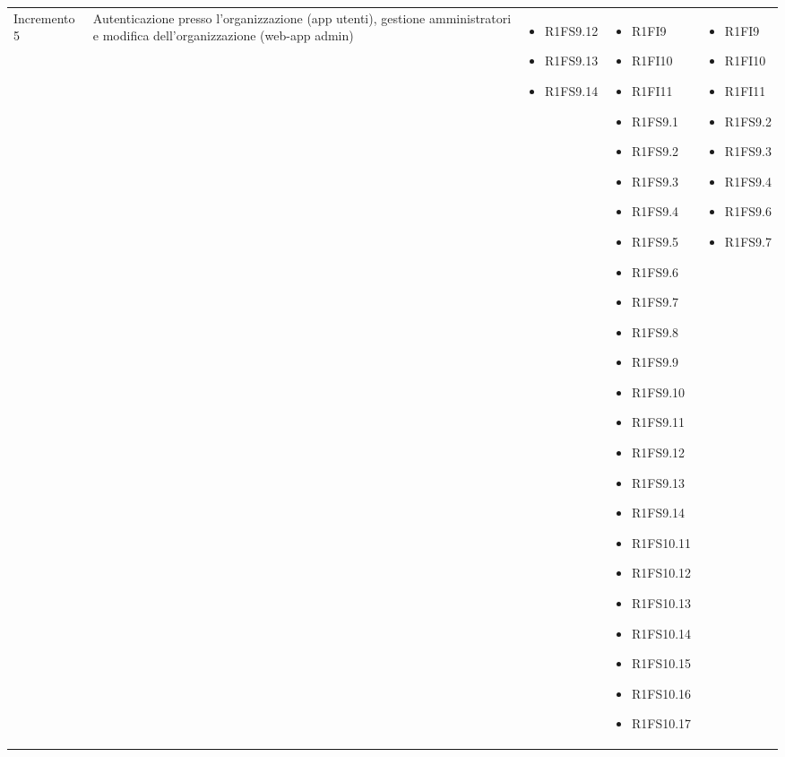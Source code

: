 {\begin{longtable}{C{2.5cm} C{3.2cm} C{2.8cm} C{2.8cm} C{2.8cm}}
Incremento 5 & Autenticazione presso l'organizzazione (app utenti), gestione amministratori  e modifica dell'organizzazione (web-app admin) & \begin{itemize}
    \item[ ] R1FS9.12
    \item[ ] R1FS9.13
    \item[ ] R1FS9.14
\end{itemize} & \begin{itemize} 
    \item[ ] R1FI9
    \item[ ] R1FI10
    \item[ ] R1FI11
    \item[ ] R1FS9.1
    \item[ ] R1FS9.2
    \item[ ] R1FS9.3
    \item[ ] R1FS9.4
    \item[ ] R1FS9.5
    \item[ ] R1FS9.6
    \item[ ] R1FS9.7
    \item[ ] R1FS9.8
    \item[ ] R1FS9.9
    \item[ ] R1FS9.10
    \item[ ] R1FS9.11
    \item[ ] R1FS9.12
    \item[ ] R1FS9.13
    \item[ ] R1FS9.14
    \item[ ] R1FS10.11
    \item[ ] R1FS10.12
    \item[ ] R1FS10.13
    \item[ ] R1FS10.14
    \item[ ] R1FS10.15
    \item[ ] R1FS10.16
    \item[ ] R1FS10.17
\end{itemize} & \begin{itemize}
    \item[ ] R1FI9
    \item[ ] R1FI10
    \item[ ] R1FI11
    \item[ ] R1FS9.2
    \item[ ] R1FS9.3
    \item[ ] R1FS9.4
    \item[ ] R1FS9.6
    \item[ ] R1FS9.7

\end{itemize}
\end{longtable}}

